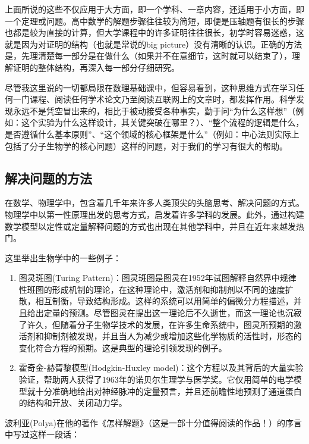\documentclass{ctexart}
\begin{document}
上面所说的这些不仅应用于大方面，即一个学科、一章内容，还适用于小方面，即一个定理或问题。高中数学的解题步骤往往较为简短，即便是压轴题有很长的步骤也都是较为直接的计算，但大学课程中的许多证明往往很长，初学时容易迷惑，这就是因为对证明的结构（也就是常说的big picture）没有清晰的认识。正确的方法是，先理清楚每一部分是在做什么（如果并不在意细节，这时就可以结束了），理解证明的整体结构，再深入每一部分仔细研究。

尽管我这里说的一切都局限在数理基础课中，但容易看到，这种思维方式在学习任何一门课程、阅读任何学术论文乃至阅读互联网上的文章时，都发挥作用。科学发现永远不是凭空冒出来的，相比于被动接受各种事实，勤于问“为什么这样想”（例如：这个实验为什么这样设计，其关键突破在哪里？）、“整个流程的逻辑是什么，是否遵循什么基本原则”、“这个领域的核心框架是什么”（例如：中心法则实际上包括了分子生物学的核心问题）这样的问题，对于我们的学习有很大的帮助。

\subsection{解决问题的方法}

在数学、物理学中，包含着几千年来许多人类顶尖的头脑思考、解决问题的方式。物理学中以第一性原理出发的思考方式，启发着许多学科的发展。此外，通过构建数学模型以定性或定量解释问题的方式也出现在其他学科中，并且在近年来越发热门。



\begin{myexample}
这里举出生物学中的一些例子：
\begin{enumerate}[leftmargin=*, labelsep=0.5em]
\item 图灵斑图(Turing Pattern)：图灵斑图是图灵在1952年试图解释自然界中规律性班图的形成机制的理论，在这种理论中，激活剂和抑制剂以不同的速度扩散，相互制衡，导致结构形成。这样的系统可以用简单的偏微分方程描述，并且给出定量的预测。尽管图灵在提出这一理论后不久逝世，而这一理论也沉寂了许久，但随着分子生物学技术的发展，在许多生命系统中，图灵所预期的激活剂和抑制剂被发现，并且当人为减少或增加这些化学物质的活性时，形态的变化符合方程的预期。这是典型的理论引领发现的例子。
\item 霍奇金-赫胥黎模型(Hodgkin-Huxley model)：这个方程以及其背后的大量实验验证，帮助两人获得了1963年的诺贝尔生理学与医学奖。它仅用简单的电学模型就十分准确地给出对神经脉冲的定量预言，并且还前瞻性地预测了通道蛋白的结构和开放、关闭动力学。
\end{enumerate}
\end{myexample}


波利亚(Polya)在他的著作《怎样解题》（这是一部十分值得阅读的作品！）的序言中写过这样一段话：
\end{document}
